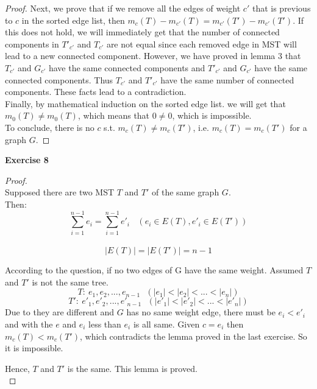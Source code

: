 \documentclass[12pt, notitlepage]{article}
\begin{document}
\begin{enumerate}[1.]
\begin{proof}
Next, we prove that if we remove all the edges of weight $c'$ that is previous to $c$ in the sorted edge list, then $m_{c}(T) - m_{c'}(T) = m_{c'}(T') - m_{c'}(T')$. If this does not hold, we will immediately get that the number of connected components in $T'_{c'}$ and $T_{c'}$ are not equal since each removed edge in MST will lead to a new connected component. However, we have proved in lemma 3 that $T_{c'}$ and $G_{c'}$ have the same connected components and $T'_{c'}$ and $G_{c'}$ have the same connected components. Thus  $T_{c'}$ and $T'_{c'}$ have the same number of connected components. These facts lead to a contradiction.\\
Finally, by mathematical induction on the sorted edge list. we will get that $m_{0}(T) \neq m_{0}(T)$, which means that $0 \neq 0$, which is impossible.\\
To conclude, there is no $c$ s.t. $m_c(T) \neq m_c(T')$, i.e. $m_c(T) = m_c(T')$ for a graph $G$.
\end{proof}
\end{enumerate}


\textbf{Exercise 8}\\
\begin{proof}
	\ \\
	Supposed there are two MST $T$ and $T'$ of the same graph $G$.\\
	Then:
	\begin{equation*}
		\sum_{i=1}^{n-1}e_i=\sum_{i=1}^{n-1}e'_i\ \ \ \ (e_i\in E(T), e'_i\in E(T'))
	\end{equation*}\
	\begin{equation*}
		|E(T)|=|E(T')|=n-1
	\end{equation*}
	
	\qquad According to the question, if no two edges of G have the same weight. Assumed $T$ and $T'$ is not the same tree.
	\begin{equation*}
		T:\ e_1, e_2, ..., e_{n-1}\ \ \ (|e_1|<|e_2|<...<|e_n|)
	\end{equation*}
	\begin{equation*}
		T':\ e'_1, e'_2, ..., e'_{n-1}\ \ \ (|e'_1|<|e'_2|<...<|e'_n|)
	\end{equation*}
	\qquad Due to they are different and $G$ has no same weight edge, there must be $e_i<e'_i$ and with the $e$ and $e_i$ less than $e_i$ is all same. Given $c=e_i$ then $m_c(T) < m_c(T')$, which contradicts the lemma proved in the last exercise. So it is impossible.
	
	\qquad Hence, $T$ and $T'$ is the same. This lemma is proved.\\
	\end{proof}
\end{document}
